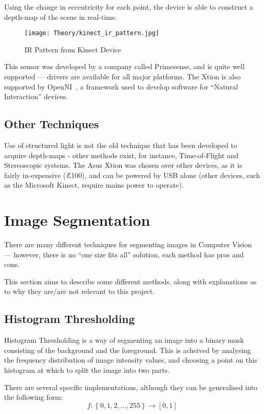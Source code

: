 Using the change in eccentricity for each point, the device is able to construct a depth-map of the scene in real-time.

\begin{figure}[H]
\centering
\texttt{[image: Theory/kinect\_ir\_pattern.jpg]}
\caption{IR Pattern from Kinect Device~\cite{primesense-irstream}}
\end{figure}

This sensor was developed by a company called Primesense, and is quite well supported --- drivers are available for all major platforms. The Xtion is also supported by OpenNI~\cite{openni}, a framework used to develop software for ``Natural Interaction'' devices. 

\subsection{Other Techniques}
Use of structured light is not the old technique that has been developed to acquire depth-maps - other methods exist, for instance, Time-of-Flight and Stereoscopic systems. The Asus Xtion was chosen over other devices, as it is fairly in-expensive (\~£100), and can be powered by USB alone (other devices, such as the Microsoft Kinect, require mains power to operate). 

\section{Image Segmentation}
There are many different techniques for segmenting images in Computer Vision --- however, there is no ``one size fits all'' solution, each method has pros and cons. 
\label{sec:segment}

This section aims to describe some different methods, along with explanations as to why they are/are not relevant to this project.

\subsection{Histogram Thresholding} 
Histogram Thresholding is a way of segmenting an image into a binary mask consisting of the background and the foreground. This is acheived by analysing the frequency distribution of image intensity values, and choosing a point on this histogram at which to split the image into two parts.  

There are several specific implementations, although they can be generalised into the following form:
\begin{equation}
f: \left\{{0,1,2,...,255}\right\} \rightarrow [0, 1]
\end{equation}

